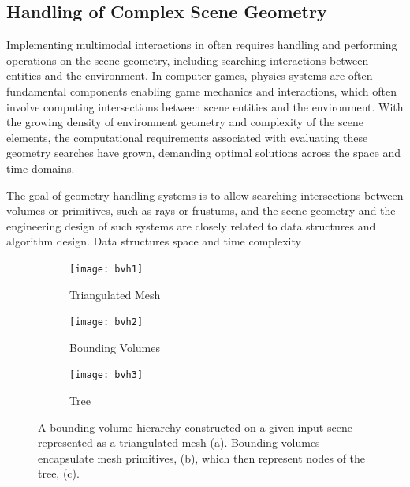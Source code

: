 \subsection{Handling of Complex Scene Geometry}\label{sec:bg-geometry-handling}
Implementing multimodal interactions in  often requires handling and performing operations on the scene geometry, including searching interactions between entities and the environment. In computer games, physics systems are often fundamental components enabling game mechanics and interactions, which often involve computing intersections between scene entities and the environment. With the growing density of environment geometry and complexity of the scene elements, the computational requirements associated with evaluating these geometry searches have grown, demanding optimal solutions across the space and time domains.\par
The goal of geometry handling systems is to allow searching intersections between volumes or primitives, such as rays or frustums, and the scene geometry and the engineering design of such systems are closely related to data structures and algorithm design. Data structures space and time complexity
\begin{figure}
    \centering
    \begin{subfigure}[t]{0.3\textwidth}
       \centering
       \texttt{[image: bvh1]}
       \caption{Triangulated Mesh}\label{fig:sub_bvh1}
    \end{subfigure}
    \hfill
    \begin{subfigure}[t]{0.3\textwidth}
       \centering
       \texttt{[image: bvh2]}
       \caption{Bounding Volumes}\label{fig:sub_bvh2}
    \end{subfigure}

    \begin{subfigure}[t]{0.8\textwidth}
        \centering
        \texttt{[image: bvh3]}
        \caption{Tree}\label{fig:sub_bvh3}
    \end{subfigure}
    \caption[Visualisation of a Bounding Volume Hierarchy]{A bounding volume hierarchy constructed on a given input scene represented as a triangulated mesh (a). Bounding volumes encapsulate mesh primitives, (b), which then represent nodes of the tree, (c).}\label{fig:bvh-diagram}
\end{figure}


